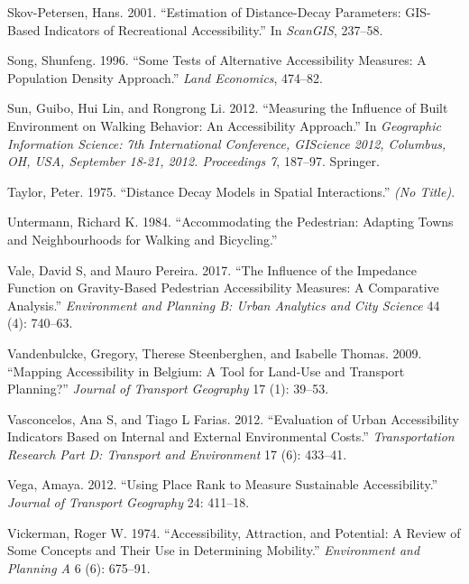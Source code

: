\documentclass[preprint, 3p,
authoryear]{elsarticle} %
\newlength{\cslhangindent}
\newlength{\cslentryspacingunit} %
\newenvironment{CSLReferences}[2] %
 {%
  \setlength{\parindent}{0pt}
  \ifodd #1
  \let\oldpar\par
  \def\par{\hangindent=\cslhangindent\oldpar}
  \fi
  \setlength{\parskip}{#2\cslentryspacingunit}
 }%
 {}
\begin{document}
\begin{CSLReferences}{1}{0}
\leavevmode{}%
Skov-Petersen, Hans. 2001. {``Estimation of Distance-Decay Parameters:
GIS-Based Indicators of Recreational Accessibility.''} In
\emph{ScanGIS}, 237--58.

\leavevmode{}%
Song, Shunfeng. 1996. {``Some Tests of Alternative Accessibility
Measures: A Population Density Approach.''} \emph{Land Economics},
474--82.

\leavevmode{}%
Sun, Guibo, Hui Lin, and Rongrong Li. 2012. {``Measuring the Influence
of Built Environment on Walking Behavior: An Accessibility Approach.''}
In \emph{Geographic Information Science: 7th International Conference,
GIScience 2012, Columbus, OH, USA, September 18-21, 2012. Proceedings
7}, 187--97. Springer.

\leavevmode{}%
Taylor, Peter. 1975. {``Distance Decay Models in Spatial
Interactions.''} \emph{(No Title)}.

\leavevmode{}%
Untermann, Richard K. 1984. {``Accommodating the Pedestrian: Adapting
Towns and Neighbourhoods for Walking and Bicycling.''}

\leavevmode{}%
Vale, David S, and Mauro Pereira. 2017. {``The Influence of the
Impedance Function on Gravity-Based Pedestrian Accessibility Measures: A
Comparative Analysis.''} \emph{Environment and Planning B: Urban
Analytics and City Science} 44 (4): 740--63.

\leavevmode{}%
Vandenbulcke, Gregory, Therese Steenberghen, and Isabelle Thomas. 2009.
{``Mapping Accessibility in Belgium: A Tool for Land-Use and Transport
Planning?''} \emph{Journal of Transport Geography} 17 (1): 39--53.

\leavevmode{}%
Vasconcelos, Ana S, and Tiago L Farias. 2012. {``Evaluation of Urban
Accessibility Indicators Based on Internal and External Environmental
Costs.''} \emph{Transportation Research Part D: Transport and
Environment} 17 (6): 433--41.

\leavevmode{}%
Vega, Amaya. 2012. {``Using Place Rank to Measure Sustainable
Accessibility.''} \emph{Journal of Transport Geography} 24: 411--18.

\leavevmode{}%
Vickerman, Roger W. 1974. {``Accessibility, Attraction, and Potential: A
Review of Some Concepts and Their Use in Determining Mobility.''}
\emph{Environment and Planning A} 6 (6): 675--91.


\end{CSLReferences}
\end{document}
